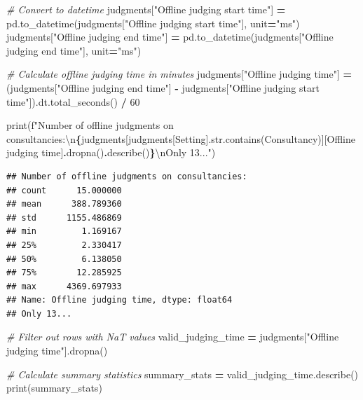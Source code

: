 \documentclass[
]{article}
\newenvironment{Shaded}{\begin{snugshade}}{\end{snugshade}}
\newcommand{\BuiltInTok}[1]{#1}
\newcommand{\CharTok}[1]{\textcolor[rgb]{0.31,0.60,0.02}{#1}}
\newcommand{\CommentTok}[1]{\textcolor[rgb]{0.56,0.35,0.01}{\textit{#1}}}
\newcommand{\DecValTok}[1]{\textcolor[rgb]{0.00,0.00,0.81}{#1}}
\newcommand{\NormalTok}[1]{#1}
\newcommand{\OperatorTok}[1]{\textcolor[rgb]{0.81,0.36,0.00}{\textbf{#1}}}
\newcommand{\SpecialCharTok}[1]{\textcolor[rgb]{0.81,0.36,0.00}{\textbf{#1}}}
\newcommand{\SpecialStringTok}[1]{\textcolor[rgb]{0.31,0.60,0.02}{#1}}
\newcommand{\StringTok}[1]{\textcolor[rgb]{0.31,0.60,0.02}{#1}}
\begin{document}
\begin{Shaded}
\begin{Highlighting}[]
\CommentTok{\# Convert to datetime}
\NormalTok{judgments[}\StringTok{"Offline judging start time"}\NormalTok{] }\OperatorTok{=}\NormalTok{ pd.to\_datetime(judgments[}\StringTok{"Offline judging start time"}\NormalTok{], unit}\OperatorTok{=}\StringTok{"ms"}\NormalTok{)}
\NormalTok{judgments[}\StringTok{"Offline judging end time"}\NormalTok{] }\OperatorTok{=}\NormalTok{ pd.to\_datetime(judgments[}\StringTok{"Offline judging end time"}\NormalTok{], unit}\OperatorTok{=}\StringTok{"ms"}\NormalTok{)}

\CommentTok{\# Calculate offline judging time in minutes}
\NormalTok{judgments[}\StringTok{"Offline judging time"}\NormalTok{] }\OperatorTok{=}\NormalTok{ (judgments[}\StringTok{"Offline judging end time"}\NormalTok{] }\OperatorTok{{-}}\NormalTok{ judgments[}\StringTok{"Offline judging start time"}\NormalTok{]).dt.total\_seconds() }\OperatorTok{/} \DecValTok{60}


\BuiltInTok{print}\NormalTok{(}\SpecialStringTok{f"Number of offline judgments on consultancies:}\CharTok{\textbackslash{}n}\SpecialCharTok{\{}\NormalTok{judgments[judgments[}\StringTok{\textquotesingle{}Setting\textquotesingle{}}\NormalTok{].}\BuiltInTok{str}\NormalTok{.contains(}\StringTok{\textquotesingle{}Consultancy\textquotesingle{}}\NormalTok{)][}\StringTok{\textquotesingle{}Offline judging time\textquotesingle{}}\NormalTok{]}\SpecialCharTok{.}\NormalTok{dropna()}\SpecialCharTok{.}\NormalTok{describe()}\SpecialCharTok{\}}\CharTok{\textbackslash{}n}\SpecialStringTok{Only 13..."}\NormalTok{)}
\end{Highlighting}
\end{Shaded}

\begin{verbatim}
## Number of offline judgments on consultancies:
## count      15.000000
## mean      388.789360
## std      1155.486869
## min         1.169167
## 25%         2.330417
## 50%         6.138050
## 75%        12.285925
## max      4369.697933
## Name: Offline judging time, dtype: float64
## Only 13...
\end{verbatim}

\begin{Shaded}
\begin{Highlighting}[]
\CommentTok{\# Filter out rows with NaT values}
\NormalTok{valid\_judging\_time }\OperatorTok{=}\NormalTok{ judgments[}\StringTok{"Offline judging time"}\NormalTok{].dropna()}

\CommentTok{\# Calculate summary statistics}
\NormalTok{summary\_stats }\OperatorTok{=}\NormalTok{ valid\_judging\_time.describe()}
\BuiltInTok{print}\NormalTok{(summary\_stats)}
\end{Highlighting}
\end{Shaded}
\end{document}
